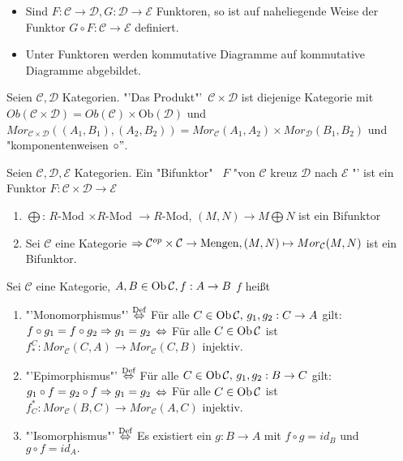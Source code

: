 \begin{anm}
	\begin{itemize}
		\item Sind $F: \mathcal{C} \to \mathcal{D}, G: \mathcal{D} \to \mathcal{E} $ Funktoren, so ist auf naheliegende Weise der Funktor $G \circ F : \mathcal{C} \to \mathcal{E}$ definiert.
		\item Unter Funktoren werden kommutative Diagramme auf kommutative Diagramme abgebildet.
	\end{itemize}
\end{anm}
\begin{df}
	Seien $\mathcal{C},\mathcal{D} $ Kategorien. "'Das Produkt"' \,$\mathcal{C} \times \mathcal{D} $ ist diejenige Kategorie mit $ Ob(\mathcal{C} \times \mathcal{D}) = Ob(\mathcal{C}) \times \text{Ob}(\mathcal{D}) $ und $ Mor_{\mathcal{C} \times \mathcal{D}}((A_1,B_1),(A_2,B_2)) = Mor_{\mathcal{C}}(A_1,A_2) \times Mor_{\mathcal{D}}(B_1,B_2)$ und "komponentenweisen $\circ"$.
\end{df}
\begin{df}
	Seien $\mathcal{C},\mathcal{D}, \mathcal{E}$ Kategorien. Ein "Bifunktor" \ $F$ "von $\mathcal{C}$ kreuz $\mathcal{D} $ nach $\mathcal{E}$ "' ist ein Funktor $F: \mathcal{C} \times \mathcal{D} \to \mathcal{E}$
\end{df}
\begin{bsp}
	\begin{enumerate}  [label= \alph*)]
		\item $\bigoplus$: $R$-Mod $\times R$-Mod $\to R$-Mod, $(M,N) \to M \bigoplus N $ ist ein Bifunktor
		\item Sei $\mathcal{C} $ eine Kategorie $\Rightarrow \mathcal{C}^{op} \times \mathcal{C} \to \text{Mengen}, (M,N) \mapsto  Mor_{\mathcal{C}}(M,N) $ ist ein Bifunktor.
	\end{enumerate}
\end{bsp}
\begin{df}
	Sei $\mathcal{C}$ eine Kategorie, $ A,B \in \text{Ob}\,\mathcal{C}, f: A \to B $ $f$ heißt
	\begin{enumerate}
		\item[] "'Monomorphismus"' $\overset{\text{Def}}{\Leftrightarrow}$ Für alle $C \in \text{Ob}\,\mathcal{C},\, g_1,g_2: C \to A $ gilt: $f \circ g_1 = f \circ g_2 \Rightarrow g_1 = g_2$ $\Leftrightarrow$ Für alle $C \in \text{Ob}\,\mathcal{C}$ ist $f_{\ast}^{C}: Mor_{\mathcal{C}}(C,A) \to Mor_{\mathcal{C}}(C,B)$ injektiv.
		\item[] "'Epimorphismus"' $\overset{\text{Def}}{\Leftrightarrow}$ Für alle $C \in \text{Ob}\,\mathcal{C}, \,g_1,g_2: B \to C $ gilt: $g_1 \circ f = g_2 \circ f \Rightarrow g_1 = g_2$ $\Leftrightarrow$ Für alle $C \in \text{Ob}\,\mathcal{C}$ ist $f_{C}^{\ast}: Mor_{\mathcal{C}}(B,C) \to Mor_{\mathcal{C}}(A,C)$ injektiv.
		\item[] "'Isomorphismus"' $\overset{\text{Def}}{\Leftrightarrow}$ Es existiert ein $g:B \to A $ mit $ f\circ g = id_B $ und $ g \circ f = id_A.$
	\end{enumerate}
\end{df}
